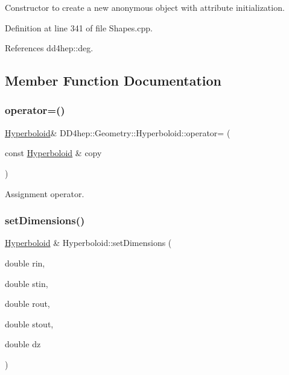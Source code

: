 Constructor to create a new anonymous object with attribute initialization. 



Definition at line 341 of file Shapes.\+cpp.



References dd4hep\+::deg.



\subsection{Member Function Documentation}
\hypertarget{class_d_d4hep_1_1_geometry_1_1_hyperboloid_a33a7c8a8077d9cee5e47ae9d3fa7722c}{}\label{class_d_d4hep_1_1_geometry_1_1_hyperboloid_a33a7c8a8077d9cee5e47ae9d3fa7722c} 
\subsubsection{\texorpdfstring{operator=()}{operator=()}}
{\footnotesize\ttfamily \hyperlink{class_d_d4hep_1_1_geometry_1_1_hyperboloid}{Hyperboloid}\& D\+D4hep\+::\+Geometry\+::\+Hyperboloid\+::operator= (\begin{DoxyParamCaption}\item[{const \hyperlink{class_d_d4hep_1_1_geometry_1_1_hyperboloid}{Hyperboloid} \&}]{copy }\end{DoxyParamCaption})\hspace{0.3cm}{\ttfamily [default]}}



Assignment operator. 

\hypertarget{class_d_d4hep_1_1_geometry_1_1_hyperboloid_a17bc3db816fee3f9486603fb799063e2}{}\label{class_d_d4hep_1_1_geometry_1_1_hyperboloid_a17bc3db816fee3f9486603fb799063e2} 
\subsubsection{\texorpdfstring{set\+Dimensions()}{setDimensions()}}
{\footnotesize\ttfamily \hyperlink{class_d_d4hep_1_1_geometry_1_1_hyperboloid}{Hyperboloid} \& Hyperboloid\+::set\+Dimensions (\begin{DoxyParamCaption}\item[{double}]{rin,  }\item[{double}]{stin,  }\item[{double}]{rout,  }\item[{double}]{stout,  }\item[{double}]{dz }\end{DoxyParamCaption})}



